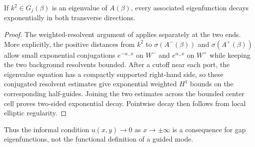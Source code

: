 \begin{proposition}
\label{prop:asymmetric-localization}
If $k^2\in G_j(\beta)$ is an eigenvalue of $A(\beta)$, every associated
eigenfunction decays exponentially in both transverse directions.
\end{proposition}
\begin{proof}
The weighted-resolvent argument of
\cite[Proposition~3.3 and Theorem~3.5]{Fliss2013} applies separately at the two
ends.  More explicitly, the positive distances from $k^2$ to
$\sigma(A^-(\beta))$ and $\sigma(A^+(\beta))$ allow small exponential
conjugations $e^{-\alpha_-x}$ on $W^-$ and $e^{\alpha_+x}$ on $W^+$ while
keeping the two background resolvents bounded.  After a cutoff near each
port, the eigenvalue equation has a compactly supported right-hand side, so
these conjugated resolvent estimates give exponential weighted $H^1$ bounds
on the corresponding half-guides.  Joining the two estimates across the
bounded center cell proves two-sided exponential decay.  Pointwise decay then
follows from local elliptic regularity.
\end{proof}

Thus the informal condition $u(x,y)\to0$ as $x\to\pm\infty$ is a consequence
for gap eigenfunctions, not the functional definition of a guided mode.
